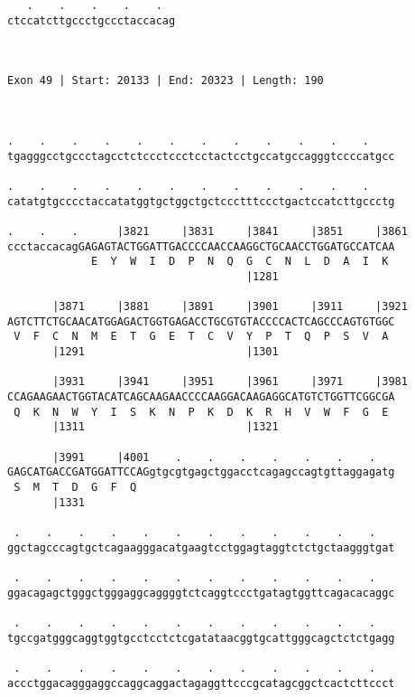 \documentclass{article}
\begin{document}
\begin{Verbatim}
   .    .    .    .    .  
ctccatcttgccctgccctaccacag
                          
                          
 
Exon 49 | Start: 20133 | End: 20323 | Length: 190



.    .    .    .    .    .    .    .    .    .    .    .    
tgagggcctgccctagcctctccctccctcctactcctgccatgccagggtccccatgcc
                                                            
.    .    .    .    .    .    .    .    .    .    .    .    
catatgtgcccctaccatatggtgctggctgctccctttccctgactccatcttgccctg
                                                            
.    .    .      |3821     |3831     |3841     |3851     |3861
ccctaccacagGAGAGTACTGGATTGACCCCAACCAAGGCTGCAACCTGGATGCCATCAA
             E  Y  W  I  D  P  N  Q  G  C  N  L  D  A  I  K 
                                     |1281                  
  
       |3871     |3881     |3891     |3901     |3911     |3921
AGTCTTCTGCAACATGGAGACTGGTGAGACCTGCGTGTACCCCACTCAGCCCAGTGTGGC
 V  F  C  N  M  E  T  G  E  T  C  V  Y  P  T  Q  P  S  V  A 
       |1291                         |1301                  
  
       |3931     |3941     |3951     |3961     |3971     |3981
CCAGAAGAACTGGTACATCAGCAAGAACCCCAAGGACAAGAGGCATGTCTGGTTCGGCGA
 Q  K  N  W  Y  I  S  K  N  P  K  D  K  R  H  V  W  F  G  E 
       |1311                         |1321                  
  
       |3991     |4001    .    .    .    .    .    .    .   
GAGCATGACCGATGGATTCCAGgtgcgtgagctggacctcagagccagtgttaggagatg
 S  M  T  D  G  F  Q                                        
       |1331                                                
  
 .    .    .    .    .    .    .    .    .    .    .    .   
ggctagcccagtgctcagaagggacatgaagtcctggagtaggtctctgctaagggtgat
                                                            
 .    .    .    .    .    .    .    .    .    .    .    .   
ggacagagctgggctgggaggcaggggtctcaggtccctgatagtggttcagacacaggc
                                                            
 .    .    .    .    .    .    .    .    .    .    .    .   
tgccgatgggcaggtggtgcctcctctcgatataacggtgcattgggcagctctctgagg
                                                            
 .    .    .    .    .    .    .    .    .    .    .    .   
accctggacagggaggccaggcaggactagaggttcccgcatagcggctcactcttccct
                                                            

\end{Verbatim}
\end{document}
